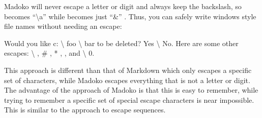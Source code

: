 \documentclass{book}
\begin{document}
\begin{mdP}[class={indent},data-line={413}]%
{}Madoko will never escape a letter or digit and always keep the backslash, so
{}%
{} becomes %
{}{\textquotedblleft}{\textbackslash}a{\textquotedblright}%
{} while %
{}\mdCode[class={code,code1}]{{\textbackslash}{\&}}%
{} becomes just %
{}{\textquotedblleft}{\&}{\textquotedblright}%
{}. Thus, you can safely write
windows style file names without needing an escape:%
\end{mdP}%
\begin{mdDiv}[class={sample},elem={sample},margin-bottom={2ex},data-line={417}]%
\begin{mdDiv}[class={sampleblock},elem={sampleblock},padding-left={1em},padding-right={1em},padding-top={-1ex},border-style={solid},border-width={1\cssPixel},line-adjust={0},data-line={418}]%
\begin{mdPre}[class={para-block,samplesource,noescape,pre-fenced},line-adjust={0},data-line={418},data-line-code={419}]%
%
\end{mdPre}%
\mdHr[class={madoko},width={0.50\linewidth},text-align={left},data-line={422}]{}\begin{mdP}[data-line={423}]%
{}Would you like c:%
{}{\textbackslash}%
{}foo%
{}{\textbackslash}%
{}bar to be deleted? Yes%
{}{\textbackslash}%
{}No. 
Here are some other escapes: %
{}{\textbackslash}%
{}, %
{}\#%
{}, %
{}*%
{}, %
{}{\textbar}%
{}, and %
{}{\textbackslash}%
{}0.%
\end{mdP}%
\end{mdDiv}%
\end{mdDiv}%
\begin{mdP}[data-line={422}]%
{}This approach is different than that of Markdown which only escapes a specific
set of characters, while Madoko escapes everything that is not a letter or digit.
The advantage of the approach of Madoko is that this is easy to remember, while
trying to remember a specific set of special escape characters is near impossible.
This is similar to the%
{}{\mdNbsp}%
{} approach to escape sequences.%
\end{mdP}%
\end{document}
